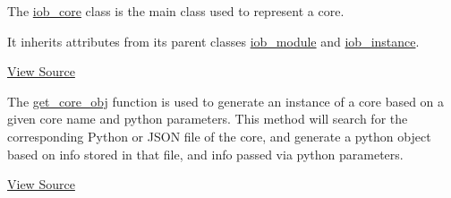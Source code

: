 %

The \href{https://github.com/IObundle/py2hwsw/blob/main/py2hwsw/scripts/iob_core.py}{iob\_core} class is the main class used to represent a core.

It inherits attributes from its parent classes \href{https://github.com/IObundle/py2hwsw/blob/main/py2hwsw/scripts/iob_module.py}{iob\_module} and \href{https://github.com/IObundle/py2hwsw/blob/main/py2hwsw/scripts/iob_instance.py}{iob\_instance}.


\href{https://github.com/IObundle/py2hwsw/blob/main/py2hwsw/scripts/iob_core.py}{View Source}

The \href{https://github.com/IObundle/py2hwsw/blob/main/py2hwsw/scripts/iob_core.py#L858}{get\_core\_obj} function is used to generate an instance of a core based on a given core name and python parameters.
This method will search for the corresponding Python or JSON file of the core, and generate a python object based on info stored in that file, and info passed via python parameters.


\href{https://github.com/IObundle/py2hwsw/blob/main/py2hwsw/scripts/iob_core.py}{View Source}
